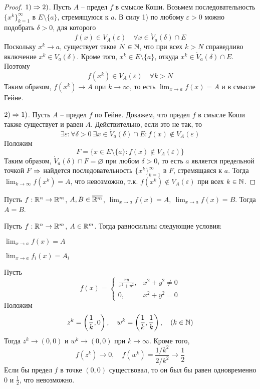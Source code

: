     \begin{proof}
        $1) \Rightarrow 2)$. Пусть $A$ -- предел $f$ в смысле Коши. Возьмем последовательность $\{x^k\}_{k = 1}^\infty$ в $E \setminus \{a\}$, стремящуюся к $a$.
        В силу 1) по любому $\varepsilon > 0$ можно подобрать $\delta > 0$, для которого
        \[f(x) \in V_A(\varepsilon) \quad \forall x \in \dot{V}_a(\delta) \cap E\]
        Поскольку $x^k \to a$, существует такое $N \in \mathbb{N}$, что при всех $k > N$ справедливо включение $x^k \in V_a(\delta)$. Кроме того, $x^k \in E \setminus \{a\}$, откуда $x^k \in \dot{V}_a(\delta) \cap E$.
        Поэтому 
        \[f(x^k) \in V_A(\varepsilon) \quad \forall k > N\]
        Таким образом, $f(x^k) \to A$ при $k \to \infty$, то есть $\lim_{x \to a} f(x) = A$ и в смысле Гейне.
        
        $2) \Rightarrow 1)$. Пусть $A$ -- предел $f$ по Гейне. Докажем, что предел $f$ в смысле Коши также существует и равен $A$.
        Действительно, если это не так, то
        \[\exists \varepsilon : \forall \delta > 0 \ \exists x \in \dot{V}_a(\delta) \cap E : f(x) \notin V_A(\varepsilon)\]
        Положим 
        \[F = \{x \in E \setminus \{a\}: f(x) \notin V_A(\varepsilon)\}\]
        Таким образом, $\dot{V}_a(\delta) \cap F = \varnothing$ при любом $\delta > 0$, то есть $a$ является предельной точкой $F$
        $\Rightarrow$ найдется последовательность $\{x^k\}_{k = 1}^\infty$ в $F$, стремящаяся к $a$. Тогда $\lim_{k \to \infty} f(x^k) = A$, что невозможно, т.к. $f(x^k) \notin V_A(\varepsilon)$ при всех $k \in \mathbb{N}$. 
    \end{proof}

    \begin{Thm}
        Пусть $f : \mathbb{R}^n \to \mathbb{R}^m$, $A, B \in \overline{\mathbb{R}^m}$, $\lim_{x \to a} f(x) = A, \ \lim_{x \to a} f(x) = B$. Тогда $A = B$.  
    \end{Thm}

    \begin{Thm}
        Пусть $f : \mathbb{R}^n \to \mathbb{R}^m$, $A \in \mathbb{R}^m$. Тогда равносильны следующие условия:
        \begin{MyList}
            \item $\lim_{x \to a} f(x) = A$ 
            \item $\lim_{x \to a} f_i(x) = A_i$
        \end{MyList}
    \end{Thm}

    \begin{Example}
        Пусть
        \[f(x) = \begin{cases}
            \frac{xy}{x^2 + y^2}, &x^2 + y^2 \neq 0 \\
            0, &x^2 + y^2 = 0
        \end{cases}\]
        Положим
        \[z^k = \left(\frac{1}{k}, 0\right), \quad w^k = \left(\frac{1}{k}, \frac{1}{k}\right), \quad (k \in \mathbb{N})\]
        Тогда $z^k \to (0, 0)$ и $w^k \to (0, 0)$ при $k \to \infty$. Кроме того,
        \[f(z^k) \to 0, \quad f(w^k) = \frac{1 / k^2}{2 / k^2} \to \frac{1}{2}\]
        Если бы предел $f$ в точке $(0, 0)$ существовал, то он был бы равен одновременно $0$ и $\frac{1}{2}$, что невозможно.  
    \end{Example}

